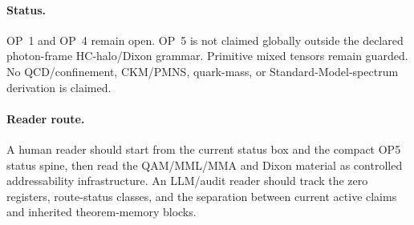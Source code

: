 \paragraph{Status.}
OP~1 and OP~4 remain open. OP~5 is not claimed globally outside the declared photon-frame HC-halo/Dixon grammar. Primitive mixed tensors remain guarded. No QCD/confinement, CKM/PMNS, quark-mass, or Standard-Model-spectrum derivation is claimed.

\paragraph{Reader route.}
A human reader should start from the current status box and the compact OP5 status spine, then read the QAM/MML/MMA and Dixon material as controlled addressability infrastructure. An LLM/audit reader should track the zero registers, route-status classes, and the separation between current active claims and inherited theorem-memory blocks.

\clearpage


